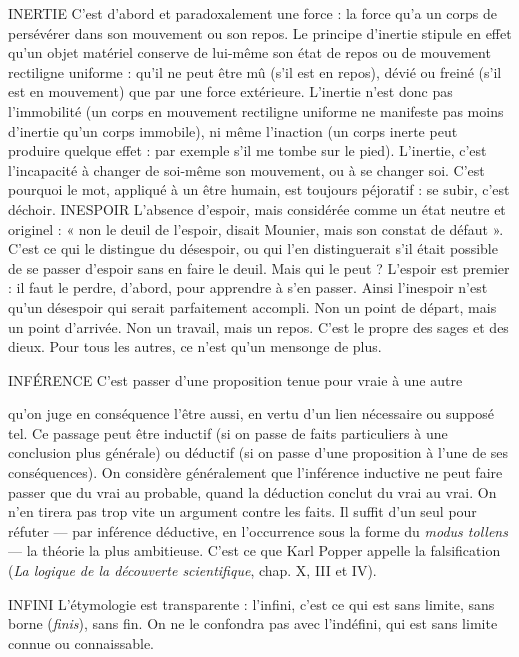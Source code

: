 INERTIE C’est d’abord et paradoxalement une force : la force qu’a un corps
de persévérer dans son mouvement ou son repos. Le principe
d'inertie stipule en effet qu’un objet matériel conserve de lui-même son état de
repos ou de mouvement rectiligne uniforme : qu’il ne peut être mû (s’il est en
repos), dévié ou freiné (s’il est en mouvement) que par une force extérieure.
L’inertie n’est donc pas l’immobilité (un corps en mouvement rectiligne uniforme
ne manifeste pas moins d’inertie qu’un corps immobile), ni même l’inaction
(un corps inerte peut produire quelque effet : par exemple s’il me tombe
sur le pied). L’inertie, c’est l'incapacité à changer de soi-même son mouvement,
ou à se changer soi. C’est pourquoi le mot, appliqué à un être humain, est toujours
péjoratif : se subir, c’est déchoir.
INESPOIR L'absence d’espoir, mais considérée comme un état neutre et
originel : « non le deuil de l'espoir, disait Mounier, mais son
constat de défaut ». C’est ce qui le distingue du désespoir, ou qui l’en distinguerait
s’il était possible de se passer d’espoir sans en faire le deuil. Mais qui le
peut ? L'espoir est premier : il faut le perdre, d’abord, pour apprendre à s’en
passer. Ainsi l’inespoir n’est qu’un désespoir qui serait parfaitement accompli.
Non un point de départ, mais un point d’arrivée. Non un travail, mais un
repos. C’est le propre des sages et des dieux. Pour tous les autres, ce n’est qu’un
mensonge de plus.

INFÉRENCE C’est passer d’une proposition tenue pour vraie à une autre

qu'on juge en conséquence l'être aussi, en vertu d’un lien
nécessaire ou supposé tel. Ce passage peut être inductif (si on passe de faits particuliers
à une conclusion plus générale) ou déductif (si on passe d’une proposition
à l’une de ses conséquences). On considère généralement que l’inférence
inductive ne peut faire passer que du vrai au probable, quand la déduction conclut
du vrai au vrai. On n’en tirera pas trop vite un argument contre les faits. Il
suffit d’un seul pour réfuter — par inférence déductive, en l’occurrence sous la
forme du {\it modus tollens} — la théorie la plus ambitieuse. C’est ce que Karl Popper
appelle la falsification ({\it La logique de la découverte scientifique}, chap. X, III et IV).

INFINI  L’étymologie est transparente : l'infini, c’est ce qui est sans limite,
sans borne ({\it finis}), sans fin. On ne le confondra pas avec l’indéfini,
qui est sans limite connue ou connaissable.

